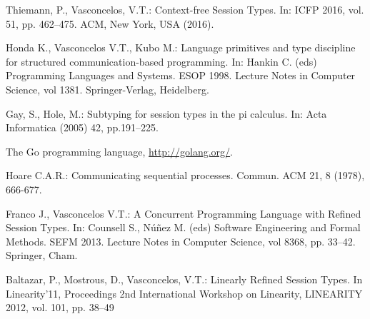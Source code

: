 
\begin{thebibliography}{8}

  Thiemann, P., Vasconcelos, V.T.: Context-free Session Types. In: ICFP 2016, vol. 51, pp. 462--475. ACM, New York, USA (2016). 

  Honda K., Vasconcelos V.T., Kubo M.: Language primitives and type discipline for structured communication-based programming. In: Hankin C. (eds) Programming Languages and Systems. ESOP 1998. Lecture Notes in Computer Science, vol 1381. Springer-Verlag, Heidelberg. 

  Gay, S., Hole, M.: Subtyping for session types in the pi calculus. In: Acta Informatica (2005)
  42, pp.191–225. 

  The Go programming language, \url{http://golang.org/}.

  Hoare C.A.R.: Communicating sequential processes. Commun. ACM 21, 8 (1978), 666-677. 
  
    Franco J., Vasconcelos V.T.: A Concurrent Programming Language with Refined Session Types. In: Counsell S., Núñez M. (eds) Software Engineering and Formal Methods. SEFM 2013. Lecture Notes in Computer Science, vol 8368, pp. 33--42. Springer, Cham. 

  Baltazar, P., Mostrous, D., Vasconcelos, V.T.: Linearly Refined Session Types. In Linearity'11, Proceedings 2nd International Workshop on Linearity, {LINEARITY} 2012, vol. 101, pp. 38--49
  
  


\end{thebibliography}


